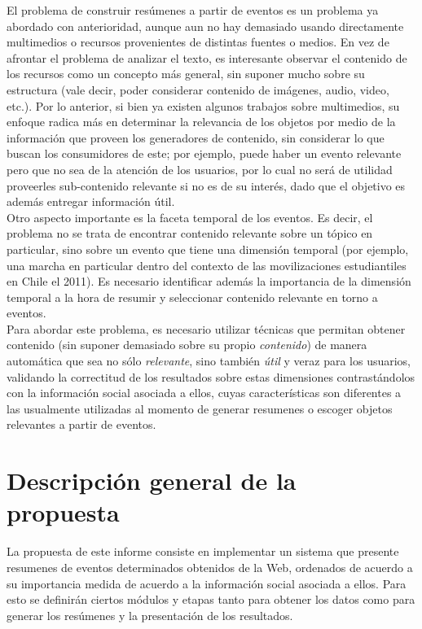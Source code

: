 \documentclass[11pt]{article}
\begin{document}
  El problema de construir resúmenes a partir de eventos es un
  problema ya abordado con anterioridad, aunque aun no hay demasiado
  usando directamente multimedios o recursos provenientes de distintas
  fuentes o medios. En vez de afrontar el problema de analizar el
  texto, es interesante observar el contenido de los recursos como un
  concepto más general, sin suponer mucho sobre su estructura (vale
  decir, poder considerar contenido de imágenes, audio, video,
  etc.). Por lo anterior, si bien ya existen algunos trabajos sobre
  multimedios, su enfoque radica más en determinar la relevancia de
  los objetos por medio de la información que proveen los generadores
  de contenido, sin considerar lo que buscan los consumidores de este;
  por ejemplo, puede haber un evento relevante pero que no sea de la
  atención de los usuarios, por lo cual no será de utilidad proveerles
  sub-contenido relevante si no es de su interés, dado que el objetivo
  es además entregar información útil.\\

  Otro aspecto importante es la faceta temporal de los eventos. Es
  decir, el problema no se trata de encontrar contenido relevante
  sobre un tópico en particular, sino sobre un evento que tiene una
  dimensión temporal (por ejemplo, una marcha en particular dentro del
  contexto de las movilizaciones estudiantiles en Chile el 2011). Es
  necesario identificar además la importancia de la dimensión temporal
  a la hora de resumir y seleccionar contenido relevante en torno a
  eventos.\\

  Para abordar este problema, es necesario utilizar técnicas que
  permitan obtener contenido (sin suponer demasiado sobre su propio
  \emph{contenido}) de manera automática que sea no sólo \emph{relevante}, sino
  también \emph{útil} y veraz para los usuarios, validando la correctitud
  de los resultados sobre estas dimensiones contrastándolos con la
  información social asociada a ellos, cuyas características son
  diferentes a las usualmente utilizadas al momento de generar
  resumenes o escoger objetos relevantes a partir de eventos.\\


\newpage
\section{Descripción general de la propuesta}
\label{sec-3}


  La propuesta de este informe consiste en implementar un sistema que
  presente resumenes de eventos determinados obtenidos de la Web,
  ordenados de acuerdo a su importancia medida de acuerdo a la
  información social asociada a ellos. Para esto se definirán ciertos
  módulos y etapas tanto para obtener los datos como para generar los
  resúmenes y la presentación de los resultados.
\end{document}
